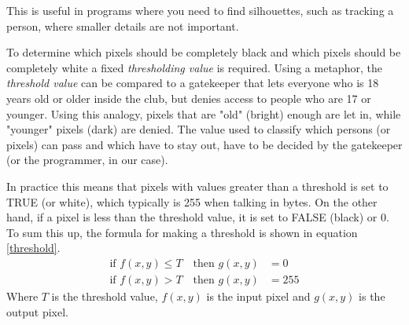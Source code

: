 This is useful in programs where you need to find silhouettes, such as tracking a person, where smaller details are not important.

To determine which pixels should be completely black and which pixels should be completely white a fixed \textit{thresholding value} is required. Using a metaphor, the \textit{threshold value} can be compared to a gatekeeper that lets everyone who is 18 years old or older inside the club, but denies access to people who are 17 or younger. Using this analogy, pixels that are "old" (bright) enough are let in, while "younger" pixels (dark) are denied. The value used to classify which persons (or pixels) can pass and which have to stay out, have to be decided by the gatekeeper (or the programmer, in our case).

In practice this means that pixels with values greater than a threshold is set to TRUE (or white), which typically is 255 when talking in bytes. On the other hand, if a pixel is less than the threshold value, it is set to FALSE (black) or 0. To sum this up, the formula for making a threshold is shown in equation \ref{threshold}.
\begin{equation}
  \begin{aligned}
  	\text{if } f(x,y)\leq T \quad \text{then } g(x,y)&= 0 \\
  	\text{if } f(x,y)>T \quad \text{then } g(x,y)&= 255
	\label{threshold}  
  \end{aligned} 
\end{equation}
Where $T$ is the threshold value, $f(x,y)$ is the input pixel and $g(x,y)$ is the output pixel. 

